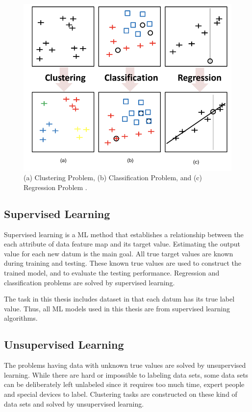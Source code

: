 \begin{figure}[h]
	\centering
	\includegraphics[width=.8\linewidth]{fig/clustering_classification_regression.png}
	\caption{(a) Clustering Problem, (b) Classification Problem, and (c) Regression Problem \cite{parallel_linear_algebra}.}
	\label{clustering_classification_regression}
\end{figure}

\subsection{Supervised Learning}

Supervised learning is a ML method that establishes a relationship between the each attribute of data feature map and its target value. Estimating the output value for each new datum is the main goal. All true target values are known during training and testing. These known true values are used to construct the trained model, and to evaluate the testing performance. Regression and classification problems are solved by supervised learning.

The task in this thesis includes dataset in that each datum has its true label value. Thus, all ML models used in this thesis are from supervised learning algorithms.

\subsection{Unsupervised Learning}

The problems having data with unknown true values are solved by unsupervised learning. While there are hard or impossible to labeling data sets, some data sets can be deliberately left unlabeled since it requires too much time, expert people and special devices to label. Clustering tasks are constructed on these kind of data sets and solved by unsupervised learning.

